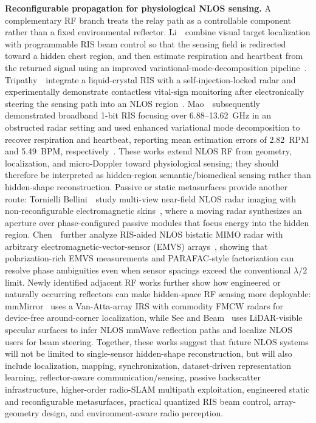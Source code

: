 \vspace{0.8mm}
\noindent \textbf{Reconfigurable propagation for physiological NLOS sensing.}
A complementary RF branch treats the relay path as a controllable component rather than a fixed environmental reflector. Li~\etal~combine visual target localization with programmable RIS beam control so that the sensing field is redirected toward a hidden chest region, and then estimate respiration and heartbeat from the returned signal using an improved variational-mode-decomposition pipeline~\cite{liRISVitalSignNLOS2025}. Tripathy~\etal~integrate a liquid-crystal RIS with a self-injection-locked radar and experimentally demonstrate contactless vital-sign monitoring after electronically steering the sensing path into an NLOS region~\cite{tripathyLCRISVitalSign2025}. Mao~\etal~subsequently demonstrated broadband 1-bit RIS focusing over 6.88--13.62~GHz in an obstructed radar setting and used enhanced variational mode decomposition to recover respiration and heartbeat, reporting mean estimation errors of 2.82~RPM and 5.49~BPM, respectively~\cite{maoRISVitalSignsIWS2026}. These works extend NLOS RF from geometry, localization, and micro-Doppler toward physiological sensing; they should therefore be interpreted as hidden-region semantic/biomedical sensing rather than hidden-shape reconstruction.
 Passive or static metasurfaces provide another route: Tornielli Bellini~\etal~study multi-view near-field NLOS radar imaging with non-reconfigurable electromagnetic skins~\cite{tornielliEMSkinsNLOS2024}, where a moving radar synthesizes an aperture over phase-configured passive modules that focus energy into the hidden region. Chen~\etal~further analyze RIS-aided NLOS bistatic MIMO radar with arbitrary electromagnetic-vector-sensor (EMVS) arrays~\cite{chenBeyondLambdaEMVS2026}, showing that polarization-rich EMVS measurements and PARAFAC-style factorization can resolve phase ambiguities even when sensor spacings exceed the conventional $\lambda/2$ limit. Newly identified adjacent RF works further show how engineered or naturally occurring reflectors can make hidden-space RF sensing more deployable: mmMirror~\cite{yanMmMirror2025} uses a Van-Atta-array IRS with commodity FMCW radars for device-free around-corner localization, while See and Beam~\cite{bandariSeeBeam2025} uses LiDAR-visible specular surfaces to infer NLOS mmWave reflection paths and localize NLOS users for beam steering. Together, these works suggest that future NLOS systems will not be limited to single-sensor hidden-shape reconstruction, but will also include localization, mapping, synchronization, dataset-driven representation learning, reflector-aware communication/sensing, passive backscatter infrastructure, higher-order radio-SLAM multipath exploitation, engineered static and reconfigurable metasurfaces, practical quantized RIS beam control, array-geometry design, and environment-aware radio perception.

